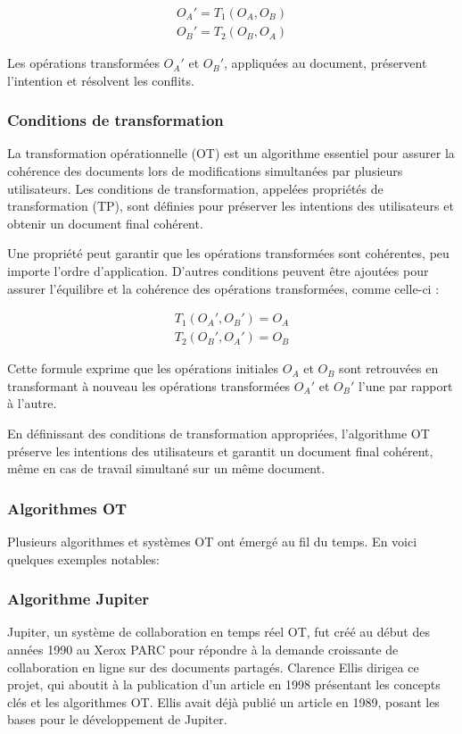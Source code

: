 \begin{equation}
    \begin{aligned}
        O_A' = T_1(O_A, O_B) \\
        O_B' = T_2(O_B, O_A)
    \end{aligned}
\end{equation}

Les opérations transformées $O_A'$ et $O_B'$, appliquées au document, préservent l'intention et résolvent les conflits.

\subsubsection{Conditions de transformation}
La transformation opérationnelle (OT) est un algorithme essentiel pour assurer la cohérence des documents lors de modifications simultanées par plusieurs utilisateurs. Les conditions de transformation, appelées propriétés de transformation (TP), sont définies pour préserver les intentions des utilisateurs et obtenir un document final cohérent.

Une propriété peut garantir que les opérations transformées sont cohérentes, peu importe l'ordre d'application. D'autres conditions peuvent être ajoutées pour assurer l'équilibre et la cohérence des opérations transformées, comme celle-ci :

\begin{equation}
    \begin{aligned}
        T_1(O_A', O_B') = O_A \\
        T_2(O_B', O_A') = O_B
    \end{aligned}
\end{equation}

Cette formule exprime que les opérations initiales $O_A$ et $O_B$ sont retrouvées en transformant à nouveau les opérations transformées $O_A'$ et $O_B'$ l'une par rapport à l'autre.

En définissant des conditions de transformation appropriées, l'algorithme OT préserve les intentions des utilisateurs et garantit un document final cohérent, même en cas de travail simultané sur un même document.
\subsubsection{Algorithmes OT}
Plusieurs algorithmes et systèmes OT ont émergé au fil du temps. En voici quelques exemples notables:

\subsubsection{Algorithme Jupiter}
Jupiter, un système de collaboration en temps réel OT, fut créé au début des années 1990 au Xerox PARC pour répondre à la demande croissante de collaboration en ligne sur des documents partagés. Clarence Ellis dirigea ce projet, qui aboutit à la publication d'un article\cite{sunOperationalTransformationRealtime1998} en 1998 présentant les concepts clés et les algorithmes OT. Ellis avait déjà publié un article\cite{ellisConcurrencyControlGroupware1989} en 1989, posant les bases pour le développement de Jupiter.

